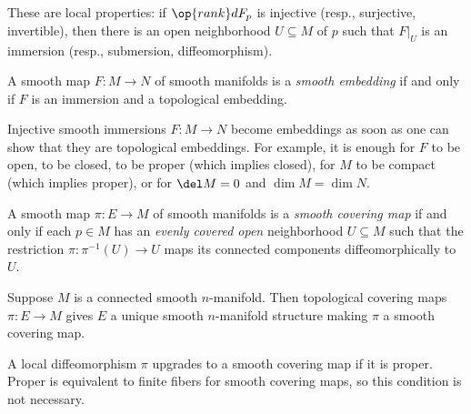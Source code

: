 \documentclass{article}
\begin{document}
\begin{remark}
	These are local properties: if $\op{rank}dF_p$ is injective (resp., surjective, invertible), then there is an open neighborhood $U\subseteq M$ of $p$ such that $F|_U$ is an immersion (resp., submersion, diffeomorphism).
\end{remark}
\begin{definition}[embedding]
	A smooth map $F\colon M\to N$ of smooth manifolds is a \textit{smooth embedding} if and only if $F$ is an immersion and a topological embedding.
\end{definition}
\begin{remark}
	Injective smooth immersions $F\colon M\to N$ become embeddings as soon as one can show that they are topological embeddings. For example, it is enough for $F$ to be open, to be closed, to be proper (which implies closed), for $M$ to be compact (which implies proper), or for $\del M=0$ and $\dim M=\dim N$.
\end{remark}
\begin{definition}
	A smooth map $\pi\colon E\to M$ of smooth manifolds is a \textit{smooth covering map} if and only if each $p\in M$ has an \textit{evenly covered open} neighborhood $U\subseteq M$ such that the restriction $\pi\colon\pi^{-1}(U)\to U$ maps its connected components diffeomorphically to $U$.
\end{definition}
\begin{remark}
	Suppose $M$ is a connected smooth $n$-manifold. Then topological covering maps $\pi\colon E\to M$ gives $E$ a unique smooth $n$-manifold structure making $\pi$ a smooth covering map.
\end{remark}
\begin{remark}
	A local diffeomorphism $\pi$ upgrades to a smooth covering map if it is proper. Proper is equivalent to finite fibers for smooth covering maps, so this condition is not necessary.
\end{remark}
\end{document}
